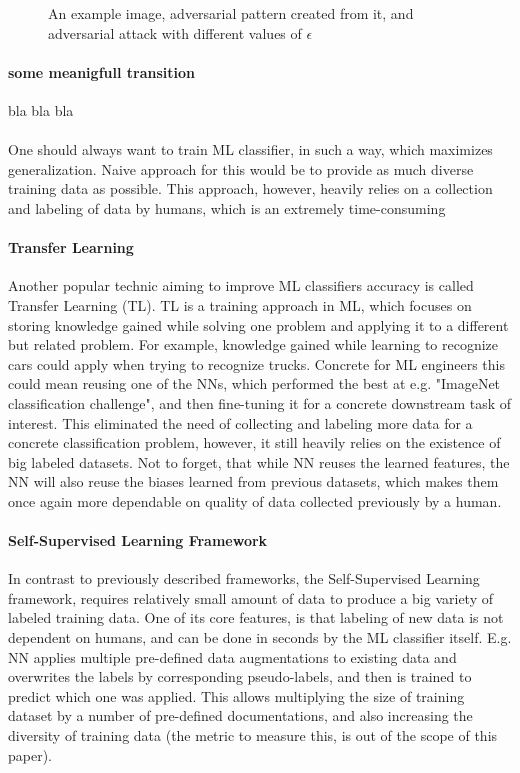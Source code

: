 \begin{figure}[h]
    \caption{An example image, adversarial pattern created from it, and adversarial attack with different values of $\epsilon$}
    \label{fig:fig-adv}
\end{figure}



\paragraph{some meanigfull transition} bla bla bla
\\
\\
One should always want to train ML classifier, in such a way, which maximizes generalization.
Naive approach for this would be to provide as much diverse training data as possible.
This approach, however, heavily relies on a collection and labeling of data by humans, which is an extremely time-consuming

\paragraph{Transfer Learning}
Another popular technic aiming to improve ML classifiers accuracy is called Transfer Learning (TL).
TL is a training approach in ML, which focuses on storing knowledge gained while solving one
problem and applying it to a different but related problem.
For example, knowledge gained while learning to recognize cars could apply when trying to recognize trucks.
Concrete for ML engineers this could mean reusing one of the NNs, which performed the best at e.g.
"ImageNet classification challenge", and then fine-tuning it for a concrete downstream task of interest.
This eliminated the need of collecting and labeling more data for a concrete classification problem,
however, it still heavily relies on the existence of big labeled datasets.
Not to forget, that while NN reuses the learned features, the NN will also reuse
the biases learned from previous datasets, which makes them once again more dependable on quality of data
collected previously by a human.


\paragraph{Self-Supervised Learning Framework}
In contrast to previously described frameworks, the Self-Supervised Learning framework, requires relatively small amount
of data to produce a big variety of labeled training data.
One of its core features, is that
labeling of new data is not dependent on humans, and can be done in seconds by the ML classifier itself.
E.g. NN applies multiple pre-defined data augmentations to existing data and overwrites the labels by corresponding
pseudo-labels, and then is trained to predict which one was applied.
This allows multiplying the size of
training dataset by a number of pre-defined documentations, and also increasing the diversity of training data
(the metric to measure this, is out of the scope of this paper).

